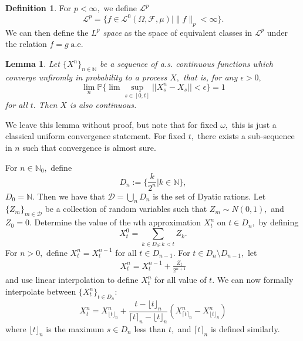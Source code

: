 \documentclass[openany, amssymb, psamsfonts]{amsart}
\newtheorem{lem}{Lemma}[section]
\theoremstyle{definition}
\newtheorem{defn}{Definition}[section]
\numberwithin{equation}{section}
\newcommand{\bbN}{\mathbb{N}}
\newcommand{\bbP}{\mathbb{P}}
\newcommand{\norm}[1]{\lVert #1 \rVert}
\newcommand{\sm}{\setminus}
\begin{document}
\begin{defn}
For $p<\infty,$ we define $\mathcal{L}^p$
\[\mathcal{L}^p = \{f\in \mathcal{L}^0(\Omega, \mathcal{F}, \mu) | \norm{f}_p< \infty\}.\] We can then define the \textit{$L^p$ space} as the space of equivalent classes in $\mathcal{L}^p$ under the relation $f = g\; \text{a.e}.$
\end{defn}

\begin{lem} %
Let $\{X^n\}_{n\in \bbN}$ be a sequence of a.s. continuous functions which converge unfiromly in probability to a process $X,$ that is, for any $\epsilon>0,$ 
\[\lim\limits_{n} \bbP\{\lim\sup_{s\in [0,t]} ||X_s^n - X_s||< \epsilon\} =1\] for all $t.$ Then $X$ is also continuous. 
\end{lem}
We leave this lemma without proof, but note that for fixed $\omega,$ this is just a classical uniform convergence statement. For fixed $t,$ there exists a sub-sequence in $n$ such that convergence is almost sure. 

For $n\in \bbN_0,$ define \[D_n := \{\frac{k}{2^n} | k \in \bbN\},\] $D_0 = \bbN.$ Then we have that $\mathcal{D} = \displaystyle\bigcup_n D_n$ is the set of Dyatic rations. Let $\{Z_m\}_{m\in \mathcal{D}}$ be a collection of random variables such that $Z_m \sim N(0,1),$ and $Z_0 = 0.$ Determine the value of the $n$th approximation $X_t^n$ on $t\in D_n,$ by defining
\[X_t^0 = \sum_{k\in D_0: k< t}Z_k.\] For $n>0,$ define $X_t^n = X_t^{n-1}$ for all $t\in D_{n-1}.$ For $t\in D_n\sm D_{n-1},$ let 
\begin{align}
X_t^n = X_t^{n-1} + \frac{Z_t}{2^{n+1}} 
\end{align}
and use linear interpolation to define $X_t^n$ for all value of $t.$ We can now formally interpolate between $\{X_t^n\}_{t\in D_n}:$
\[X_t^n = X^n_{\lfloor t\rfloor_n} + \frac{t - \lfloor t\rfloor_n}{\lceil t\rceil_n - \lfloor t\rfloor_n}(X^n_{\lceil t\rceil_n} - X^n_{\lfloor t\rfloor_n})\] where $\lfloor t\rfloor_n$ is the maximum $s\in D_n$ less than $t,$ and $\lceil t\rceil_n$ is defined similarly. 
\end{document}
